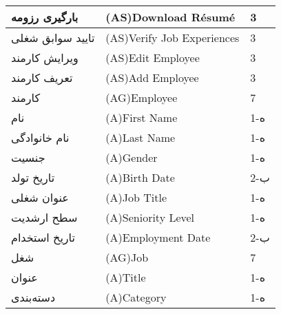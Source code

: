 \documentclass[12pt]{article}
\begin{document}
\begin{longtable}{|l|l|l|}
		بارگیری رزومه & (AS)Download Résumé & 3     \\
		\hline
		تایید سوابق شغلی & (AS)Verify Job Experiences & 3     \\
		\hline
		ویرایش کارمند & (AS)Edit Employee & 3     \\
		\hline
		تعریف کارمند & (AS)Add Employee & 3     \\
		\hline
		کارمند & (AG)Employee & 7     \\
		\hline
		نام & (A)First Name & 1-ه   \\
		\hline
		نام خانوادگی & (A)Last Name & 1-ه   \\
		\hline
		جنسیت & (A)Gender & 1-ه   \\
		\hline
		تاریخ تولد & (A)Birth Date & 2-ب   \\
		\hline
		عنوان شغلی & (A)Job Title & 1-ه   \\
		\hline
		سطح ارشدیت & (A)Seniority Level & 1-ه   \\
		\hline
		تاریخ استخدام & (A)Employment Date & 2-ب   \\
		\hline
		شغل & (AG)Job & 7     \\
		\hline
		عنوان & (A)Title & 1-ه   \\
		\hline
		دسته‌بندی & (A)Category & 1-ه   \\
		\hline
	\end{longtable}
	
\end{document}
